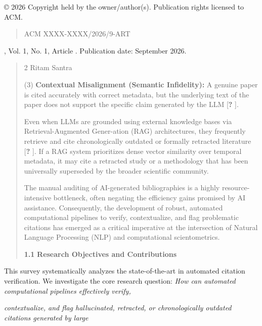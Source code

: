 \documentclass[
]{article}
\begin{document}
© 2026 Copyright held by the owner/author(s). Publication rights
licensed to ACM.

\begin{quote}
ACM XXXX-XXXX/2026/9-ART
\end{quote}

, Vol. 1, No. 1, Article . Publication date: September 2026.

\begin{quote}
2 Ritam Santra

(3) \textbf{Contextual Misalignment (Semantic Infidelity):} A genuine
paper is cited accurately with correct metadata, but the underlying text
of the paper does not support the specific claim generated by the LLM
{[}\textbf{?} {]}.

Even when LLMs are grounded using external knowledge bases via
Retrieval-Augmented Gener-ation (RAG) architectures, they frequently
retrieve and cite chronologically outdated or formally retracted
literature {[}\textbf{?} {]}. If a RAG system prioritizes dense vector
similarity over temporal metadata, it may cite a retracted study or a
methodology that has been universally superseded by the broader
scientific community.

The manual auditing of AI-generated bibliographies is a highly
resource-intensive bottleneck, often negating the efficiency gains
promised by AI assistance. Consequently, the development of robust,
automated computational pipelines to verify, contextualize, and flag
problematic citations has emerged as a critical imperative at the
intersection of Natural Language Processing (NLP) and computational
scientometrics.

\textbf{1.1} \textbf{Research Objectives and Contributions}
\end{quote}

This survey systematically analyzes the state-of-the-art in automated
citation verification. We investigate the core research question:
\emph{How can automated computational pipelines effectively verify,}

\emph{contextualize, and flag hallucinated, retracted, or
chronologically outdated citations generated by large}
\end{document}
